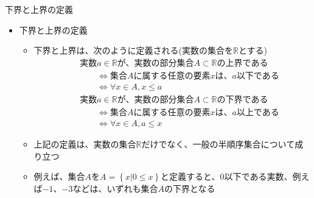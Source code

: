 \documentclass[dvipdfmx,notheorems,t]{beamer}
\begin{document}
\begin{frame}{下界と上界の定義}

\begin{itemize}
	\item 下界と上界の定義
	\begin{itemize}
		\item \alert{下界}と\alert{上界}は、次のように定義される(実数の集合を$\mathbb{R}$とする)
		\begin{eqnarray}
			&& \text{実数$a \in \mathbb{R}$が、実数の部分集合$A \subset \mathbb{R}$の上界である} \nonumber \\
			&& \qquad \Leftrightarrow \text{集合$A$に属する任意の要素$x$は、$a$以下である} \nonumber \\
			&& \qquad \Leftrightarrow \forall x \in A, x \le a
		\end{eqnarray}
		\begin{eqnarray}
			&& \text{実数$a \in \mathbb{R}$が、実数の部分集合$A \subset \mathbb{R}$の下界である} \nonumber \\
			&& \qquad \Leftrightarrow \text{集合$A$に属する任意の要素$x$は、$a$以上である} \nonumber \\
			&& \qquad \Leftrightarrow \forall x \in A, a \le x
		\end{eqnarray}
		
		\item 上記の定義は、実数の集合$\mathbb{R}$だけでなく、一般の半順序集合について成り立つ
		\item 例えば、集合$A$を$A = \left\{ x | 0 \le x \right\}$と定義すると、$0$以下である実数、例えば$-1$、$-3$などは、いずれも集合$A$の下界となる
	\end{itemize}
\end{itemize}

\end{frame}
\end{document}
